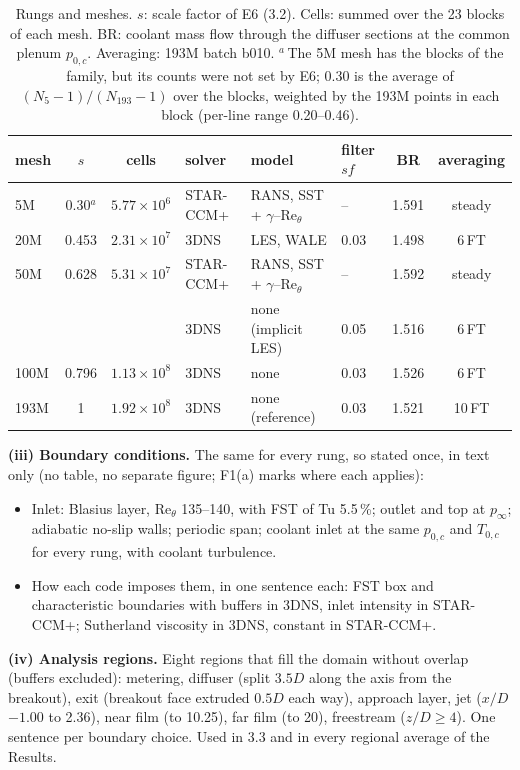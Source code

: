 \documentclass[10pt]{article}
\begin{document}
\begin{table}[H]
\centering\footnotesize\setlength{\tabcolsep}{4pt}
\begin{tabular}{@{}l c c l l l c c@{}}
\toprule
mesh & $s$ & cells & solver & model & filter $sf$ & BR & averaging \\
\midrule
5M   & 0.30$^a$ & $5.77\times10^{6}$ & STAR-CCM+ & RANS, SST + $\gamma$--Re$_\theta$ & -- & 1.591 & steady \\
20M  & 0.453 & $2.31\times10^{7}$ & 3DNS & LES, WALE & 0.03 & 1.498 & 6\,FT \\
50M  & 0.628 & $5.31\times10^{7}$ & STAR-CCM+ & RANS, SST + $\gamma$--Re$_\theta$ & -- & 1.592 & steady \\
     &       &                    & 3DNS & none (implicit LES) & 0.05 & 1.516 & 6\,FT \\
100M & 0.796 & $1.13\times10^{8}$ & 3DNS & none & 0.03 & 1.526 & 6\,FT \\
193M & 1     & $1.92\times10^{8}$ & 3DNS & none (reference) & 0.03 & 1.521 & 10\,FT \\
\bottomrule
\end{tabular}
\caption{Rungs and meshes. $s$: scale factor of E6 (3.2). Cells: summed over the 23 blocks of each mesh. BR:
coolant mass flow through the diffuser sections at the common plenum $p_{0,c}$. Averaging: 193M batch b010.
$^a$\,The 5M mesh has the blocks of the family, but its counts were not set by E6; 0.30 is the average of
$(N_{5}-1)/(N_{193}-1)$ over the blocks, weighted by the 193M points in each block (per-line range 0.20--0.46).}
\end{table}

\textbf{(iii) Boundary conditions.} The same for every rung, so stated once, in text only (no table, no
separate figure; F1(a) marks where each applies):
\begin{itemize}
\item Inlet: Blasius layer, $\mathrm{Re}_\theta$ 135--140, with FST of Tu 5.5\,\%; outlet and top at
  $p_\infty$; adiabatic no-slip walls; periodic span; coolant inlet at the same $p_{0,c}$ and $T_{0,c}$ for
  every rung, with coolant turbulence.
\item How each code imposes them, in one sentence each: FST box and characteristic boundaries with buffers in
  3DNS, inlet intensity in STAR-CCM+; Sutherland viscosity in 3DNS, constant in STAR-CCM+.
\end{itemize}

\textbf{(iv) Analysis regions.} Eight regions that fill the domain without overlap (buffers excluded):
metering, diffuser (split $3.5D$ along the axis from the breakout), exit (breakout face extruded $0.5D$ each
way), approach layer, jet ($x/D$ $-1.00$ to 2.36), near film (to 10.25), far film (to 20), freestream
($z/D\ge4$). One sentence per boundary choice. Used in 3.3 and in every regional average of the Results.
\end{document}
